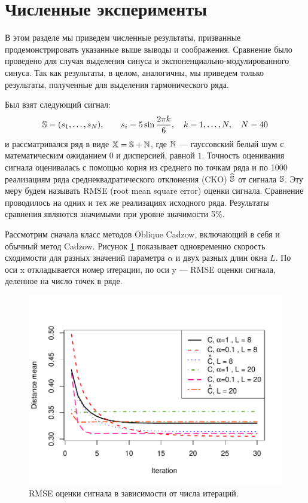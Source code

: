 \documentclass[12pt,a4paper,fleqn,leqno]{article}
\begin{document}
\section{Численные эксперименты}
\label{sec:simul}
В этом разделе мы приведем численные результаты, призванные продемонстрировать указанные выше выводы и соображения.
Сравнение было проведено для случая выделения синуса и экспоненциально-модулированного синуса.
Так как результаты, в целом, аналогичны, мы приведем только результаты, полученные для выделения гармонического ряда.

Был взят следующий сигнал:
\begin{equation*}
\mathbb{S} = (s_{1}, \ldots, s_N), \qquad s_{i} = 5\sin{\frac{2 \pi k}{6}}, \quad k = 1, \ldots, N, \quad N = 40
\end{equation*}
и рассматривался ряд в виде $\mathbb{X} = \mathbb{S} + \mathbb{N}$, где  $\mathbb{N}$ --- гауссовский белый шум с математическим ожиданием $0$ и дисперсией, равной $1$.
Точность оценивания сигнала оценивалась с помощью корня из среднего по точкам ряда и по 1000 реализациям ряда среднеквадратического отклонения (CKO)
$\widehat{\mathbb{S}}$ от сигнала $\mathbb{S}$.
Эту меру будем называть RMSE (root mean square error) оценки сигнала.
Сравнение проводилось на одних и тех же реализациях исходного ряда. Результаты сравнения являются значимыми
при уровне значимости 5\%.

Рассмотрим сначала класс методов Oblique Cadzow, включающий в себя и обычный метод Cadzow.
Рисунок \ref{img_cadzowspeed2} показывает одновременно скорость сходимости для разных значений параметра $\alpha$ и двух разных длин окна $L$.
По оси x откладывается номер итерации, по оси y --- RMSE оценки сигнала, деленное на число точек в ряде.
\begin{figure}[!hhh]
\begin{center}
\includegraphics[width = \textwidth]{cadzowspeed_2.pdf}
\caption{RMSE оценки сигнала в зависимости от числа итераций.}
\label{img_cadzowspeed2}
\end{center}
\end{figure}
\end{document}
